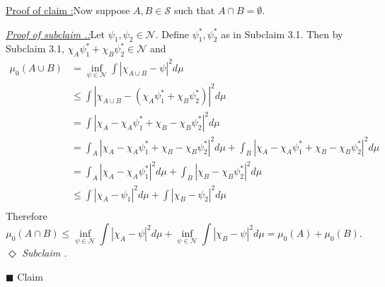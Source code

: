 \documentclass[12pt]{article}
\newcounter{ProofCounter}
\newcounter{ClaimCounter}[ProofCounter]
\newcounter{SubClaimCounter}[ClaimCounter]
\newenvironment{claimproof}[1]{\par\noindent\underline{Proof of claim \theClaimCounter:}\space#1}{\hfill $\blacksquare$ Claim \theClaimCounter}
\newenvironment{subclaim}[1]{\stepcounter{SubClaimCounter}\par\noindent\emph{\underline{Subclaim \theClaimCounter.\theSubClaimCounter:}}\space#1}{}
\newenvironment{subclaimproof}[1]{\par\noindent\emph{\underline{Proof of subclaim \theClaimCounter.\theSubClaimCounter:}}\space#1}{\hfill
$\Diamond$ \emph{Subclaim \theClaimCounter.\theSubClaimCounter}}
\begin{document}
\begin{claimproof}
Now suppose $A,B \in \mathcal{S}$ such that $A\cap B = \emptyset$.
\begin{subclaimproof}
Let $\psi_{1}, \psi_{2} \in \mathcal{N}$. Define $\psi_{1}^{*}, \psi_{2}^{*}$ as in Subclaim 3.1. Then by Subclaim 3.1, $\chi_{A}\psi_{1}^{*} +
\chi_{B}\psi_{2}^{*} \in \mathcal{N}$ and 
\begin{align*}
\mu_0(A\cup B) & = \inf_{\psi \in \mathcal{N}}\int |\chi_{A\cup B} - \psi|^{2}d\mu \\
& \leq \int|\chi_{A\cup B} - (\chi_{A}\psi_{1}^{*} + \chi_{B}\psi_{2}^{*})|^{2}d\mu \\
& = \int|\chi_{A} - \chi_{A}\psi_{1}^{*} + \chi_{B} - \chi_{B}\psi_{2}^{*}|^{2}d\mu \\
& = \int_{A}|\chi_{A} - \chi_{A}\psi_{1}^{*} + \chi_{B} - \chi_{B}\psi_{2}^{*}|^{2}d\mu + 
\int_{B}|\chi_{A} - \chi_{A}\psi_{1}^{*} + \chi_{B} - \chi_{B}\psi_{2}^{*}|^{2}d\mu \\
& = \int_{A}|\chi_{A} - \chi_{A}\psi_{1}^{*}|^{2}d\mu + \int_{B}|\chi_{B} - \chi_{B}\psi_{2}^{*}|^{2}d\mu \\
& \leq \int|\chi_{A} - \psi_{1}|^{2}d\mu + \int|\chi_{B} - \psi_{2}|^{2}d\mu \\
\end{align*}
Therefore 
\[ \mu_0(A\cap B) \leq \inf_{\psi\in \mathcal{N}}\int|\chi_{A} - \psi|^{2}d\mu + \inf_{\psi\in\mathcal{N}}\int|\chi_{B} - \psi|^{2}d\mu =
\mu_0(A) + \mu_0(B). \]
\end{subclaimproof}


\end{claimproof}
\end{document}
